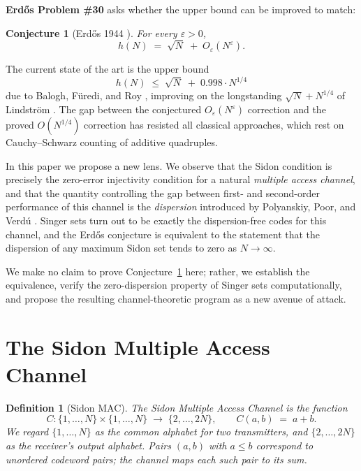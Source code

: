 \documentclass[12pt]{amsart}
\newtheorem{conjecture}[theorem]{Conjecture}
\newtheorem{definition}[theorem]{Definition}
\newcommand{\eps}{\varepsilon}
\begin{document}
\textbf{Erd\H{o}s Problem \#30} asks whether the upper bound can be improved to match:
\begin{conjecture}[Erd\H{o}s 1944 \cite{Erdos44}]
\label{conj:erdos30}
For every $\eps > 0$,
\[
   h(N) \;=\; \sqrt{N} \;+\; O_\eps\!\left(N^\eps\right).
\]
\end{conjecture}

The current state of the art is the upper bound
\[
   h(N) \;\le\; \sqrt{N} \;+\; 0.998 \cdot N^{1/4}
\]
due to Balogh, F\"{u}redi, and Roy \cite{BFR23}, improving on the
longstanding $\sqrt{N} + N^{1/4}$ of Lindstr\"{o}m \cite{Lind69}.  The gap
between the conjectured $O_\eps(N^\eps)$ correction and the proved $O(N^{1/4})$
correction has resisted all classical approaches, which rest on Cauchy--Schwarz
counting of additive quadruples.

In this paper we propose a new lens.  We observe that the Sidon condition is
precisely the zero-error injectivity condition for a natural \emph{multiple
access channel}, and that the quantity controlling the gap between first- and
second-order performance of this channel is the \emph{dispersion} introduced by
Polyanskiy, Poor, and Verd\'{u} \cite{PPV10}.  Singer sets turn out to be
exactly the dispersion-free codes for this channel, and the Erd\H{o}s
conjecture is equivalent to the statement that the dispersion of any maximum
Sidon set tends to zero as $N \to \infty$.

We make no claim to prove Conjecture~\ref{conj:erdos30} here; rather, we
establish the equivalence, verify the zero-dispersion property of Singer sets
computationally, and propose the resulting channel-theoretic program as a new
avenue of attack.

\section{The Sidon Multiple Access Channel}
\label{sec:mac}

\begin{definition}[Sidon MAC]
\label{def:sidon-mac}
The \emph{Sidon Multiple Access Channel} is the function
\[
   C : \{1,\ldots,N\} \times \{1,\ldots,N\} \;\longrightarrow\; \{2,\ldots,2N\},
   \qquad C(a,b) \;=\; a + b.
\]
We regard $\{1,\ldots,N\}$ as the common alphabet for two transmitters, and
$\{2,\ldots,2N\}$ as the receiver's output alphabet.  Pairs $(a,b)$ with $a \le
b$ correspond to unordered codeword pairs; the channel maps each such pair to
its sum.
\end{definition}
\end{document}
